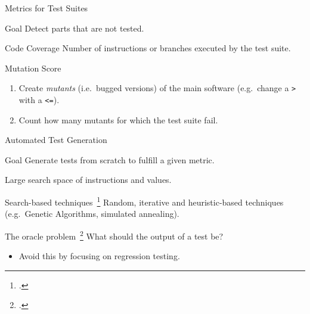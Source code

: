 \documentclass{beamer}
\begin{document}
\begin{frame}{Metrics for Test Suites}
  \begin{block}{Goal}
    Detect parts that are not tested.
  \end{block}

  \pause{}

  \begin{exampleblock}{Code Coverage}
    Number of instructions or branches executed by the test suite.
  \end{exampleblock}

  \pause{}

  \begin{exampleblock}{Mutation Score}
    \begin{enumerate}
      \item Create \emph{mutants} (i.e.\ bugged versions) of the main software (e.g.\ change a \texttt{>} with a \texttt{<=}).
      \item Count how many mutants for which the test suite fail.
    \end{enumerate}
  \end{exampleblock}
\end{frame}

\begin{frame}{Automated Test Generation}
  \begin{block}{Goal}
    Generate tests from scratch to fulfill a given metric.

    Large search space of instructions and values.
  \end{block}

  \begin{exampleblock}{Search-based techniques~\footcite{mcminn2011search,fraser2011evosuite}}
    Random, iterative and heuristic-based techniques (e.g.\ Genetic Algorithms, simulated annealing).
  \end{exampleblock}

  \pause{}

  \begin{block}{The oracle problem~\footcite{barr2015oracle}}
    What should the output of a test be?

    \begin{itemize}
      \item Avoid this by focusing on regression testing.
    \end{itemize}
  \end{block}
\end{frame}
\end{document}

